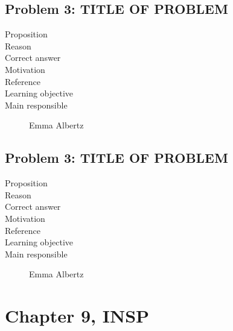 \documentclass[10pt,a4paper]{article}
\begin{document}
\subsection*{Problem 3: TITLE OF PROBLEM}
\begin{description}
\item[Proposition] 
\item[Reason] 
\item[Correct answer]
\item[Motivation]
\item[Reference]
\item[Learning objective]
\item[Main responsible] Emma Albertz
\end{description}

\subsection*{Problem 3: TITLE OF PROBLEM}
\begin{description}
\item[Proposition] 
\item[Reason] 
\item[Correct answer]
\item[Motivation]
\item[Reference]
\item[Learning objective]
\item[Main responsible] Emma Albertz
\end{description}

\section*{Chapter 9, INSP}
\end{document}
